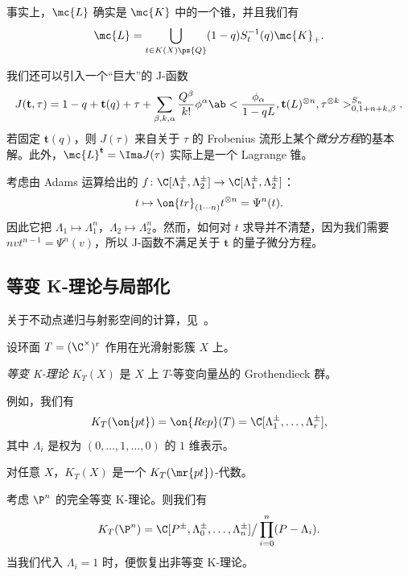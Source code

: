 \begin{prop}
    事实上，\(\mc{L}\) 确实是 \(\mc{K}\) 中的一个锥，并且我们有
    \[ \mc{L} = \bigcup_{t \in K(X)\ps{Q}} (1-q) S_{t}^{-1}(q) \mc{K}_+. \]
\end{prop}

我们还可以引入一个``巨大''的 J-函数
\[ J(\mathbf{t}, \tau) = 1-q + \mathbf{t}(q) + \tau + \sum_{\beta, k, \alpha} \frac{Q^{\beta}}{k!} \phi^{\alpha} \ab< \frac{\phi_{\alpha}}{1-qL}, \mathbf{t}(L)^{\otimes n}, \tau^{\otimes k}>_{0,1+n+k,\beta}^{S_n}. \]
若固定 \(\mathbf{t}(q)\)，则 \(J(\tau)\) 来自关于 \(\tau\) 的 Frobenius 流形上某个\textit{微分方程}的基本解。此外，\(\mc{L}^{\mathbf{t}}=  \Ima J(\tau)\) 实际上是一个 Lagrange 锥。

\begin{exm}
    考虑由 Adams 运算给出的 \(f \colon \C[\Lambda_1^{\pm}, \Lambda_2^{\pm}] \to \C[\Lambda_1^{\pm}, \Lambda_2^{\pm}]\)：
    \[ t \mapsto \on{tr}_{(1\cdots n)} t^{\otimes n} = \Psi^n (t). \]
    因此它把 \(\Lambda_1 \mapsto \Lambda_1^n\)，\(\Lambda_2 \mapsto \Lambda_2^n\)。然而，如何对 \(t\) 求导并不清楚，因为我们需要 \(nv t^{n-1} = \Psi^n(v)\)，所以 J-函数不满足关于 \(\mathbf{t}\) 的量子微分方程。
\end{exm}

\subsection{等变 K-理论与局部化}%
\label{sub:Equivariant K-theory and localization}

关于不动点递归与射影空间的计算，见~\cite{GiventalK2}。

设环面 \(T = (\C^{\times})^r\) 作用在光滑射影簇 \(X\) 上。

\begin{defn}
    \textit{等变 K-理论} \(K_T(X)\) 是 \(X\) 上 \(T\)-等变向量丛的 Grothendieck 群。
\end{defn}

\begin{exm}
    例如，我们有
    \[ K_T(\on{pt}) = \on{Rep}(T) = \C[\Lambda_1^{\pm}, \ldots, \Lambda_r^{\pm}], \]
    其中 \(\Lambda_i\) 是权为 \((0, \ldots, 1, \ldots, 0)\) 的 \(1\) 维表示。
\end{exm}

\begin{rmk}
    对任意 \(X\)，\(K_T(X)\) 是一个 \(K_T(\mr{pt})\)-代数。
\end{rmk}

\begin{exm}
    考虑 \(\P^n\) 的完全等变 K-理论。则我们有
    \[ K_T(\P^n) = \C[P^{\pm}, \Lambda_0^{\pm}, \ldots, \Lambda_n^{\pm}] \big/ \prod_{i=0}^n (P-\Lambda_i). \]
    当我们代入 \(\Lambda_i = 1\) 时，便恢复出非等变 K-理论。
\end{exm}

